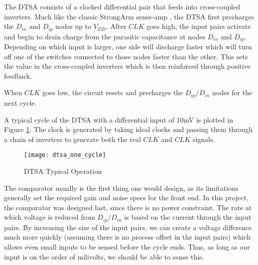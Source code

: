 \clearpage
The DTSA consists of a clocked differential pair that feeds into cross-coupled inverters. Much like the classic StrongArm sense-amp \cite{razavi_strongarm_2015}, the DTSA first precharges the $D_{in}$ and $D_{ip}$ nodes up to $V_{DD}$. After $CLK$ goes high, the input pairs activate and begin to drain charge from the parasitic capacitance at nodes $D_{in}$ and $D_{ip}$. Depending on which input is larger, one side will discharge faster which will turn off one of the switches connected to those nodes faster than the other. This sets the value in the cross-coupled inverters which is then reinforced through positive feedback. 

When $CLK$ goes low, the circuit resets and precharges the $D_{ip}/D_{in}$ nodes for the next cycle.

A typical cycle of the DTSA with a differential input of 10mV is plotted in Figure \ref{fig:dtsa_op}. The clock is generated by taking ideal clocks and passing them through a chain of inverters to generate both the real $CLK$ and $\overline{CLK}$ signals.
\begin{figure}[h]
\centering
\texttt{[image: dtsa\_one\_cycle]}
\caption{DTSA Typical Operation}
\label{fig:dtsa_op}
\end{figure}

The comparator usually is the first thing one would design, as its limitations generally set the required gain and noise specs for the front end. In this project, the comparator was designed last, since there is no power constraint. The rate at which voltage is reduced from $D_{ip}/D_{in}$ is based on the current through the input pairs. By increasing the size of the input pairs, we can create a voltage difference much more quickly (assuming there is no process offset in the input pairs) which allows even small inputs to be sensed before the cycle ends. Thus, as long as our input is on the order of milivolts, we should be able to sense this.

